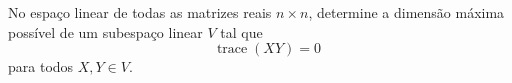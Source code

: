 No espaço linear de todas as matrizes reais \(n \times n\), determine a dimensão máxima possível de um subespaço linear \(V\) tal que
\[ \quad \operatorname{trace}(XY) = 0\]
para todos \(X, Y \in V\).
